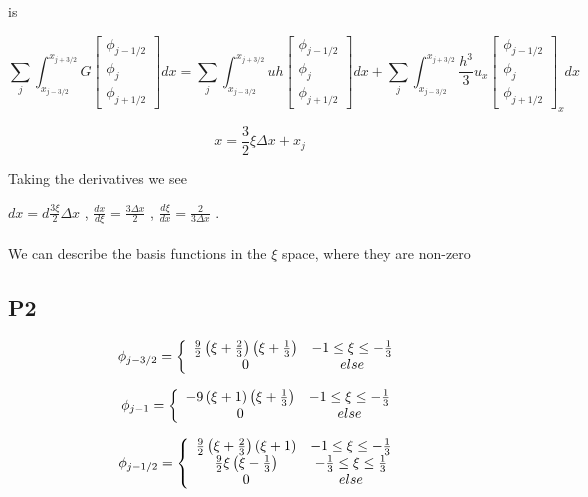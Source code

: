 \documentclass[12pt]{article}
\begin{document}
is 

\[\sum_{j}\int_{x_{j-3/2}}^{x_{j+3/2}}G\left[\begin{array}{c}\phi_{j-1/2} \\\phi_{j}\\\phi_{j+1/2} \end{array}\right]  dx = \sum_{j}\int_{x_{j-3/2}}^{x_{j+3/2}} uh \left[\begin{array}{c}\phi_{j-1/2} \\\phi_{j}\\\phi_{j+1/2} \end{array}\right] dx + \sum_{j}\int_{x_{j-3/2}}^{x_{j+3/2}}\frac{h^3}{3}u_{x}\left[\begin{array}{c}\phi_{j-1/2} \\\phi_{j}\\\phi_{j+1/2} \end{array}\right]_xdx\]


$$x = \frac{3}{2}\xi\Delta x + x_{j}$$

Taking the derivatives we see


$dx = d\frac{3\xi}{2}\Delta x$ , $\frac{dx}{d\xi} = \frac{3\Delta x}{2}$ , $\frac{d\xi}{dx} = \frac{2}{3\Delta x}$ . \\ \\ We can describe the basis functions in the $\xi$ space, where they are non-zero

\subsection{P2}

\[\phi_{j-3/2} =  \left\lbrace \begin{array}{c c}
\frac{9}{2}\left(\xi + \frac{2}{3}\right)\left(\xi + \frac{1}{3}\right) & -1 \le \xi \le -\frac{1}{3}\\
0 & else
\end{array} \right. \]

\[\phi_{j-1} =  \left\lbrace \begin{array}{c c}
-9\left(\xi + 1\right)\left(\xi + \frac{1}{3}\right) & -1 \le \xi \le -\frac{1}{3}\\
0 & else
\end{array} \right. \]

\[\phi_{j-1/2} =  \left\lbrace \begin{array}{c c}
\frac{9}{2}\left(\xi + \frac{2}{3}\right)\left(\xi + 1\right) & -1 \le \xi \le -\frac{1}{3} \\
\frac{9}{2}\xi\left(\xi - \frac{1}{3}\right)  & -\frac{1}{3} \le \xi \le \frac{1}{3}\\
0 & else
\end{array} \right. \]
\end{document}
